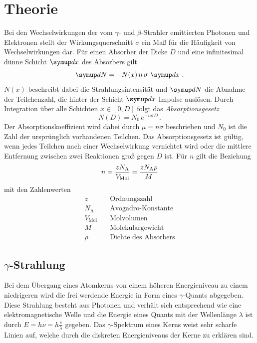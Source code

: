 \section{Theorie}
\label{sec:Theorie}

Bei den Wechselwirkungen der vom $\gamma$- und $\beta$-Strahler emittierten Photonen und Elektronen
stellt der Wirkungsquerschnitt $\sigma$ ein Maß für die Häufigkeit von Wechselwirkungen dar.
Für einen Absorber der Dicke $D$ und eine infinitesimal dünne Schicht $\dif{x}$ des Absorbers gilt
\begin{equation}
    \dif{N} = -N(x) \, n \, \sigma \, \dif{x} \, .
\end{equation}
$N(x)$ beschreibt dabei die Strahlungsintensität und $\dif{N}$ die Abnahme der Teilchenzahl,
die hinter der Schicht $\dif{x}$ Impulse auslösen.
Durch Integration über alle Schichten $x \in [0, D]$ folgt das \textit{Absorptionsgesetz}
\begin{equation} \label{eq:absorptionsgesetz}
    N(D) = N_\text{0} \, e^{-n \sigma D} \, .
\end{equation}
Der Absorptionskoeffizient wird dabei durch $\mu = n \sigma$ beschrieben und 
$N_\text{0}$ ist die Zahl der ursprünglich vorhandenen Teilchen.
Das Absorptionsgesetz ist gültig, wenn jedes Teilchen nach einer Wechselwirkung
vernichtet wird oder die mittlere Entfernung zwischen zwei Reaktionen groß gegen $D$ ist.
Für $n$ gilt die Beziehung
\begin{equation} \label{eq:anzahl}
    n = \frac{z N_\text{A}}{V_\text{Mol}} = \frac{z N_\text{A} \rho}{M} \\
\end{equation}
mit den Zahlenwerten
\begin{align*}
    z                &\quad \text{Ordnungszahl}         \\
    N_\text{A}       &\quad \text{Avogadro-Konstante}   \\
    V_\text{Mol}     &\quad \text{Molvolumen}           \\
    M                &\quad \text{Molekulargewicht}     \\
    \rho             &\quad \text{Dichte des Absorbers} 
\end{align*}


\subsection[Gamma-Strahlung]{$\gamma$-Strahlung}

Bei dem Übergang eines Atomkerns von einem höheren Energieniveau zu einem niedrigeren
wird die frei werdende Energie in Form eines $\gamma$-Quants abgegeben. 
Diese Strahlung besteht aus Photonen und verhält sich entsprechend wie eine elektromagnetische Welle 
und die Energie eines Quants mit der Wellenlänge $\lambda$ ist durch $E = h \nu = h \frac{c}{\lambda}$ gegeben. 
Das $\gamma$-Spektrum eines Kerns weist sehr scharfe Linien auf,
welche durch die diskreten Energieniveaus der Kerne zu erklären sind.

